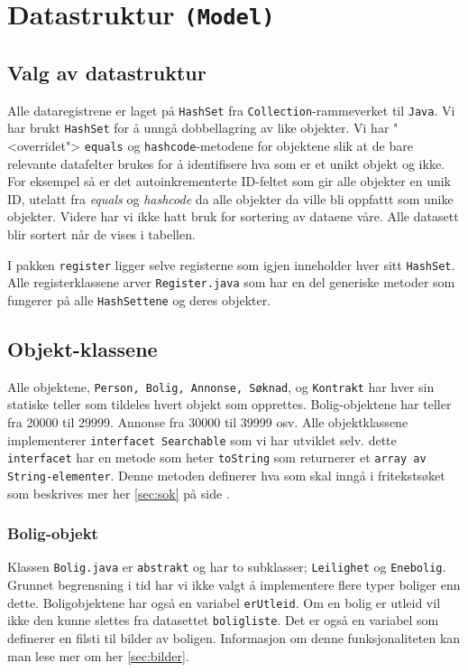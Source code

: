 \section{Datastruktur \texttt{(Model)}} \label{sec:Datastruktur}

\subsection{Valg av datastruktur}
Alle dataregistrene er laget på \texttt{HashSet} fra \texttt{Collection}-rammeverket til \texttt{Java}. Vi har brukt \texttt{HashSet} for å unngå dobbellagring av like objekter. Vi har "<overridet"> \texttt{equals} og \texttt{hashcode}-metodene for objektene slik at de bare relevante datafelter brukes for å identifisere hva som er et unikt objekt og ikke. For eksempel så er det autoinkrementerte ID-feltet som gir alle objekter en unik ID, utelatt fra \emph{equals} og \emph{hashcode} da alle objekter da ville bli oppfattt som unike objekter.
Videre har vi ikke hatt bruk for sortering av dataene våre. Alle datasett blir sortert når de vises i tabellen.

I pakken \texttt{register} ligger selve registerne som igjen inneholder hver sitt \texttt{HashSet}. Alle registerklassene arver \texttt{Register.java} som har en del generiske metoder som fungerer på alle \texttt{HashSettene} og deres objekter.

\subsection{Objekt-klassene}
Alle objektene, \texttt{Person, Bolig, Annonse, Søknad}, og \texttt{Kontrakt} har hver sin statiske teller som tildeles hvert objekt som opprettes. Bolig-objektene har teller fra 20000 til 29999. Annonse fra 30000 til 39999 osv.
Alle objektklassene implementerer \texttt{interfacet Searchable} som vi har utviklet selv. dette \texttt{interfacet} har en metode som heter \texttt{toString} som returnerer et \texttt{array av String-elementer}. Denne metoden definerer hva som skal inngå i fritekstsøket som beskrives mer her \ref{sec:sok} på side \pageref{sec:sok}.

\subsubsection{Bolig-objekt}
Klassen \texttt{Bolig.java} er \texttt{abstrakt} og har to subklasser; \texttt{Leilighet} og \texttt{Enebolig}. Grunnet begrensning i tid har vi ikke valgt å implementere flere typer boliger enn dette.
Boligobjektene har også en variabel \texttt{erUtleid}. Om en bolig er utleid vil ikke den kunne slettes fra datasettet \texttt{boligliste}.
Det er også en variabel som definerer en filsti til bilder av boligen. Informasjon om denne funksjonaliteten kan man lese mer om her \ref{sec:bilder}.

